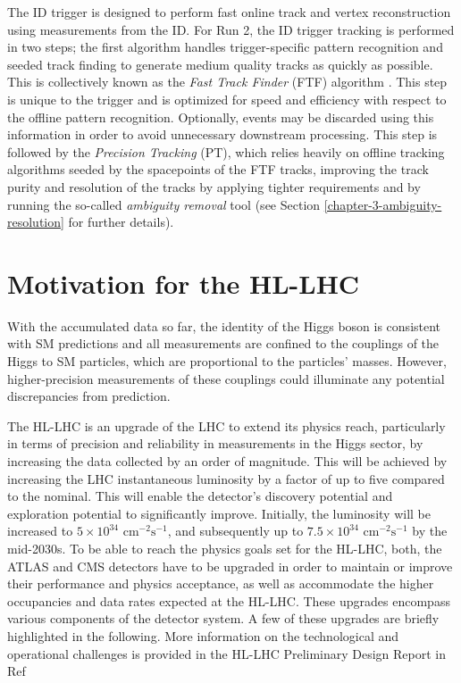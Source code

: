 The ID trigger is designed to perform fast online track and vertex reconstruction using measurements from the ID. For Run 2, the ID trigger tracking is performed in two steps; the first algorithm handles trigger-specific pattern recognition and seeded track finding to generate medium quality tracks as quickly as possible. This is collectively known as the \textit{Fast Track Finder} (FTF) algorithm \cite{Penc:2104217, Grandi:2624768}. This step is unique to the trigger and is optimized for speed and efficiency with respect to the offline pattern recognition. Optionally, events may be discarded using this information in order to avoid unnecessary downstream processing. This step is followed by the \textit{Precision Tracking} (PT), which relies heavily on offline tracking algorithms \cite{T_Cornelissen_2008} seeded by the spacepoints of the FTF tracks, improving the track purity and resolution of the tracks by applying tighter requirements and by running the so-called \textit{ambiguity removal} tool (see Section \ref{chapter-3-ambiguity-resolution} for further details). 



\newpage
\section{Motivation for the HL-LHC}
\label{hi-lumi}


With the accumulated data so far, the identity of the Higgs boson is consistent with SM predictions and all measurements are confined to the couplings of the Higgs to SM particles, which are proportional to the particles’ masses. However, higher-precision measurements of these couplings could illuminate any potential discrepancies from prediction.

The HL-LHC is an upgrade of the \ac{LHC} to extend its physics reach, particularly in terms of precision and reliability in measurements in the Higgs sector, by increasing the data collected by an order of magnitude. This will be achieved by increasing the LHC instantaneous luminosity by a factor of up to five compared to the nominal. This will enable the detector's discovery potential and exploration potential to significantly improve. Initially, the luminosity will be increased to $5 \times 10^{34}  \text{ cm}^{−2}\text{s}^{−1}$, and subsequently up to $7.5 \times 10^{34}  \text{ cm}^{−2}\text{s}^{−1}$ by the mid-2030s. To be able to reach the physics goals set for the HL-LHC, both, the ATLAS and CMS detectors have to be upgraded in order to maintain or improve their performance and physics acceptance, as well as accommodate the higher occupancies and data rates expected at the HL-LHC. These upgrades encompass various components of the detector system. A few of these upgrades are briefly highlighted in the following. More information on the technological and operational challenges is provided in the HL-LHC Preliminary Design Report in Ref \cite{Apollinari:2116337}

